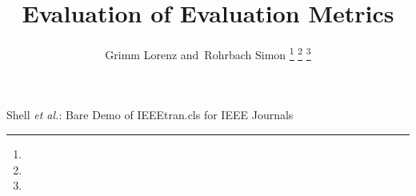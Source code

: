 \documentclass[journal]{IEEEtran}
\begin{document}
%
\title{Evaluation of Evaluation Metrics}
%
%
%

\author{Grimm Lorenz
        and~Rohrbach Simon%
\thanks{}%
\thanks{}%
\thanks{}}

% 
%



%
{Shell \MakeLowercase{\textit{et al.}}: Bare Demo of IEEEtran.cls for IEEE Journals}
% 
\end{document}
